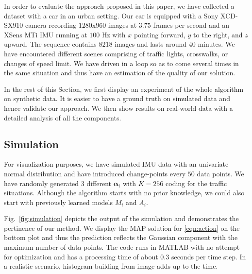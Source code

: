 In order to evaluate the approach proposed in this paper, we have collected
a dataset with a car in an urban setting. Our car is equipped with a Sony
XCD-SX910 camera recording $1280$x$960$ images at $3.75$ frames per second and
an XSens MTi IMU running at $100$ Hz with $x$ pointing forward, $y$ to the
right, and $z$ upward. The sequence contains $8218$ images and lasts around $40$
minutes. We have encountered different scenes comprising of traffic lights,
crosswalks, or changes of speed limit. We have driven in a loop so as to come
several times in the same situation and thus have an estimation of the quality
of our solution.

In the rest of this Section, we first display an experiment of the whole
algorithm on synthetic data. It is easier to have a ground truth on simulated
data and hence validate our approach. We then show results on real-world data
with a detailed analysis of all the components.

\subsection{Simulation}
For visualization purposes, we have simulated IMU data with an univariate normal
distribution and have introduced change-points every $50$ data points. We have
randomly generated 3 different $\boldsymbol{\alpha}_i$ with $K=256$ coding for
the traffic situations. Although the algorithm starts with no prior knowledge,
we could also start with previously learned models $M_i$ and $A_i$.

Fig.~\ref{fig:simulation} depicts the output of the simulation and demonstrates
the pertinence of our method. We display the MAP solution for \eqref{eqn:action}
on the bottom plot and thus the prediction reflects the Gaussian component with
the maximum number of data points. The code runs in MATLAB with no attempt for
optimization and has a processing time of about $0.3$ seconds per time step. In
a realistic scenario, histogram building from image adds up to the time.


